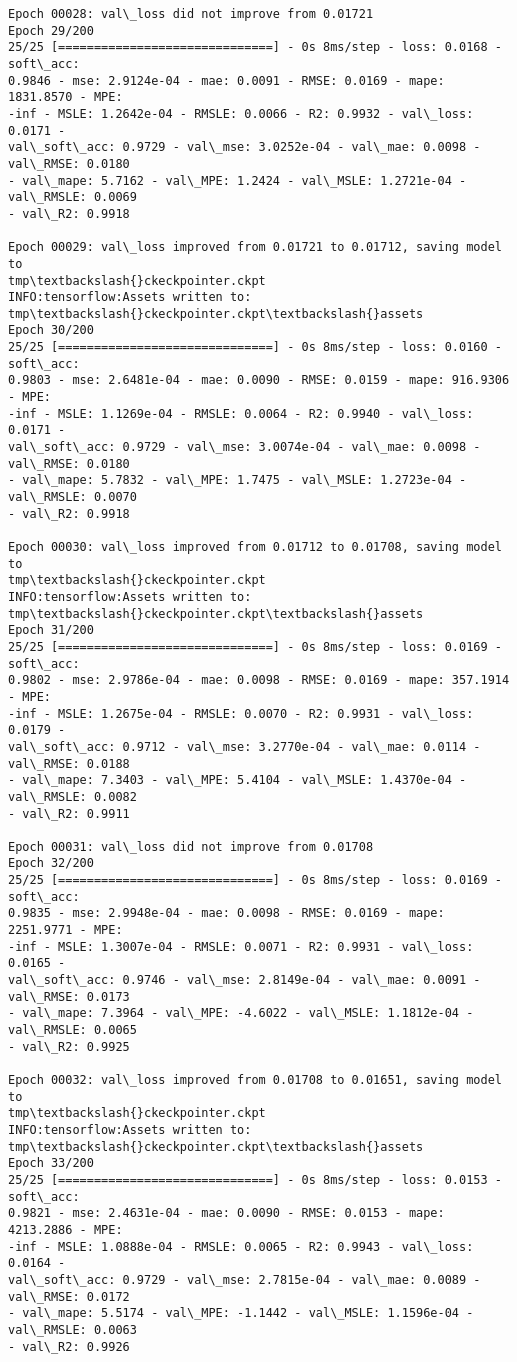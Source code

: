 \documentclass[11pt]{article}
\begin{document}
\begin{Verbatim}[commandchars=\\\{\}]
Epoch 00028: val\_loss did not improve from 0.01721
Epoch 29/200
25/25 [==============================] - 0s 8ms/step - loss: 0.0168 - soft\_acc:
0.9846 - mse: 2.9124e-04 - mae: 0.0091 - RMSE: 0.0169 - mape: 1831.8570 - MPE:
-inf - MSLE: 1.2642e-04 - RMSLE: 0.0066 - R2: 0.9932 - val\_loss: 0.0171 -
val\_soft\_acc: 0.9729 - val\_mse: 3.0252e-04 - val\_mae: 0.0098 - val\_RMSE: 0.0180
- val\_mape: 5.7162 - val\_MPE: 1.2424 - val\_MSLE: 1.2721e-04 - val\_RMSLE: 0.0069
- val\_R2: 0.9918

Epoch 00029: val\_loss improved from 0.01721 to 0.01712, saving model to
tmp\textbackslash{}ckeckpointer.ckpt
INFO:tensorflow:Assets written to: tmp\textbackslash{}ckeckpointer.ckpt\textbackslash{}assets
Epoch 30/200
25/25 [==============================] - 0s 8ms/step - loss: 0.0160 - soft\_acc:
0.9803 - mse: 2.6481e-04 - mae: 0.0090 - RMSE: 0.0159 - mape: 916.9306 - MPE:
-inf - MSLE: 1.1269e-04 - RMSLE: 0.0064 - R2: 0.9940 - val\_loss: 0.0171 -
val\_soft\_acc: 0.9729 - val\_mse: 3.0074e-04 - val\_mae: 0.0098 - val\_RMSE: 0.0180
- val\_mape: 5.7832 - val\_MPE: 1.7475 - val\_MSLE: 1.2723e-04 - val\_RMSLE: 0.0070
- val\_R2: 0.9918

Epoch 00030: val\_loss improved from 0.01712 to 0.01708, saving model to
tmp\textbackslash{}ckeckpointer.ckpt
INFO:tensorflow:Assets written to: tmp\textbackslash{}ckeckpointer.ckpt\textbackslash{}assets
Epoch 31/200
25/25 [==============================] - 0s 8ms/step - loss: 0.0169 - soft\_acc:
0.9802 - mse: 2.9786e-04 - mae: 0.0098 - RMSE: 0.0169 - mape: 357.1914 - MPE:
-inf - MSLE: 1.2675e-04 - RMSLE: 0.0070 - R2: 0.9931 - val\_loss: 0.0179 -
val\_soft\_acc: 0.9712 - val\_mse: 3.2770e-04 - val\_mae: 0.0114 - val\_RMSE: 0.0188
- val\_mape: 7.3403 - val\_MPE: 5.4104 - val\_MSLE: 1.4370e-04 - val\_RMSLE: 0.0082
- val\_R2: 0.9911

Epoch 00031: val\_loss did not improve from 0.01708
Epoch 32/200
25/25 [==============================] - 0s 8ms/step - loss: 0.0169 - soft\_acc:
0.9835 - mse: 2.9948e-04 - mae: 0.0098 - RMSE: 0.0169 - mape: 2251.9771 - MPE:
-inf - MSLE: 1.3007e-04 - RMSLE: 0.0071 - R2: 0.9931 - val\_loss: 0.0165 -
val\_soft\_acc: 0.9746 - val\_mse: 2.8149e-04 - val\_mae: 0.0091 - val\_RMSE: 0.0173
- val\_mape: 7.3964 - val\_MPE: -4.6022 - val\_MSLE: 1.1812e-04 - val\_RMSLE: 0.0065
- val\_R2: 0.9925

Epoch 00032: val\_loss improved from 0.01708 to 0.01651, saving model to
tmp\textbackslash{}ckeckpointer.ckpt
INFO:tensorflow:Assets written to: tmp\textbackslash{}ckeckpointer.ckpt\textbackslash{}assets
Epoch 33/200
25/25 [==============================] - 0s 8ms/step - loss: 0.0153 - soft\_acc:
0.9821 - mse: 2.4631e-04 - mae: 0.0090 - RMSE: 0.0153 - mape: 4213.2886 - MPE:
-inf - MSLE: 1.0888e-04 - RMSLE: 0.0065 - R2: 0.9943 - val\_loss: 0.0164 -
val\_soft\_acc: 0.9729 - val\_mse: 2.7815e-04 - val\_mae: 0.0089 - val\_RMSE: 0.0172
- val\_mape: 5.5174 - val\_MPE: -1.1442 - val\_MSLE: 1.1596e-04 - val\_RMSLE: 0.0063
- val\_R2: 0.9926


\end{Verbatim}
\end{document}
